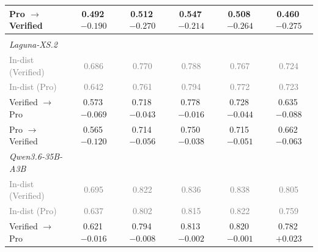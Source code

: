 \begin{table}[t]
\begin{tabular}{lccccc}
\qquad{}Pro $\rightarrow$ Verified & 0.492\,{\scriptsize \textcolor{red!70!black}{$-0.190$}} & 0.512\,{\scriptsize \textcolor{red!70!black}{$-0.270$}} & 0.547\,{\scriptsize \textcolor{red!70!black}{$-0.214$}} & 0.508\,{\scriptsize \textcolor{red!70!black}{$-0.264$}} & 0.460\,{\scriptsize \textcolor{red!70!black}{$-0.275$}}  \\
\midrule
\multicolumn{6}{l}{\textit{\Semantic{}}} \\
\quad{}\textit{Laguna-XS.2} \\
\qquad{}\textcolor{gray}{\small In-dist (Verified)} & \textcolor{gray}{\small 0.686} & \textcolor{gray}{\small 0.770} & \textcolor{gray}{\small 0.788} & \textcolor{gray}{\small 0.767} & \textcolor{gray}{\small 0.724} \\
\qquad{}\textcolor{gray}{\small In-dist (Pro)} & \textcolor{gray}{\small 0.642} & \textcolor{gray}{\small 0.761} & \textcolor{gray}{\small 0.794} & \textcolor{gray}{\small 0.772} & \textcolor{gray}{\small 0.723} \\
\qquad{}Verified $\rightarrow$ Pro & 0.573\,{\scriptsize \textcolor{red!70!black}{$-0.069$}} & 0.718\,{\scriptsize \textcolor{red!70!black}{$-0.043$}} & 0.778\,{\scriptsize \textcolor{red!70!black}{$-0.016$}} & 0.728\,{\scriptsize \textcolor{red!70!black}{$-0.044$}} & 0.635\,{\scriptsize \textcolor{red!70!black}{$-0.088$}}  \\
\qquad{}Pro $\rightarrow$ Verified & 0.565\,{\scriptsize \textcolor{red!70!black}{$-0.120$}} & 0.714\,{\scriptsize \textcolor{red!70!black}{$-0.056$}} & 0.750\,{\scriptsize \textcolor{red!70!black}{$-0.038$}} & 0.715\,{\scriptsize \textcolor{red!70!black}{$-0.051$}} & 0.662\,{\scriptsize \textcolor{red!70!black}{$-0.063$}}  \\
\quad{}\textit{Qwen3.6-35B-A3B} \\
\qquad{}\textcolor{gray}{\small In-dist (Verified)} & \textcolor{gray}{\small 0.695} & \textcolor{gray}{\small 0.822} & \textcolor{gray}{\small 0.836} & \textcolor{gray}{\small 0.838} & \textcolor{gray}{\small 0.805} \\
\qquad{}\textcolor{gray}{\small In-dist (Pro)} & \textcolor{gray}{\small 0.637} & \textcolor{gray}{\small 0.802} & \textcolor{gray}{\small 0.815} & \textcolor{gray}{\small 0.822} & \textcolor{gray}{\small 0.759} \\
\qquad{}Verified $\rightarrow$ Pro & 0.621\,{\scriptsize \textcolor{red!70!black}{$-0.016$}} & 0.794\,{\scriptsize \textcolor{red!70!black}{$-0.008$}} & 0.813\,{\scriptsize \textcolor{red!70!black}{$-0.002$}} & 0.820\,{\scriptsize \textcolor{red!70!black}{$-0.001$}} & 0.782\,{\scriptsize \textcolor{green!50!black}{$+0.023$}}  \\

\end{tabular}
\end{table}
